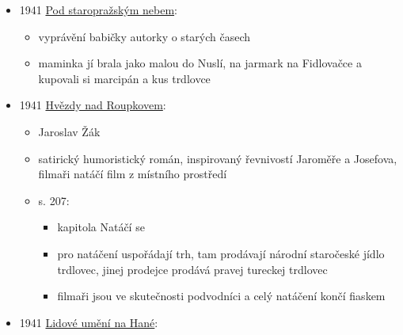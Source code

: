 \begin{itemize}
  \begin{itemize}
  \tightlist
  \item
    roč. 52, č. 1,
  \item
    \emph{Vesna a počátky národopisu}, 
  \item
    Vesna původně vznikla v roce 1870 jako Dívčí pěvecký spolek Vesna v
    Brně
  \item
    zájem o národopis u Vesny posílila výstava spoluku Vlasteneckého
    muzea v Olomouci roku 1885
  \item
    s. 62: Pomlázka Vesny. Národopisným půvabem lákaly hanácké bochte a
    makovníčky, trdelníky a mazance, tvarožňáky a trnčáky, které mohly
    směle konkurovat městskému cukroví, bábovkám a dortům.
  \end{itemize}
\item
  1941
  \href{https://ceskadigitalniknihovna.cz/view/uuid:5247f390-0408-11ed-bd12-005056827e51?page=uuid\%3Ac9bca5eb-64b6-4861-a251-c29522db0865&fulltext=trdlovce&source=mzk}{Pod
  staropražským nebem}:

  \begin{itemize}
  \tightlist
  \item
    vyprávění babičky autorky o starých časech
  \item
    maminka jí brala jako malou do Nuslí, na jarmark na Fidlovačce a
    kupovali si marcipán a kus trdlovce
  \end{itemize}
\item
  1941
  \href{https://ceskadigitalniknihovna.cz/view/uuid:5a644b90-81df-11e4-9d8c-005056827e51?page=uuid\%3A645f2680-95c9-11e4-a2db-005056825209&source=nkp}{Hvězdy
  nad Roupkovem}:

  \begin{itemize}
  \tightlist
  \item
    Jaroslav Žák
  \item
    satirický humoristický román, inspirovaný řevnivostí Jaroměře a
    Josefova, filmaři natáčí film z místního prostředí
  \item
    s. 207:

    \begin{itemize}
    \tightlist
    \item
      kapitola Natáčí se
    \item
      pro natáčení uspořádají trh, tam prodávají národní staročeské
      jídlo trdlovec, jinej prodejce prodává pravej tureckej trdlovec
    \item
      filmaři jsou ve skutečnosti podvodníci a celý natáčení končí
      fiaskem
    \end{itemize}
  \end{itemize}
\item
  1941
  \href{https://ndk.cz/uuid/uuid:3d76f2a0-2cf6-11e4-8e0d-005056827e51}{Lidové
  umění na Hané}:


\end{itemize}
